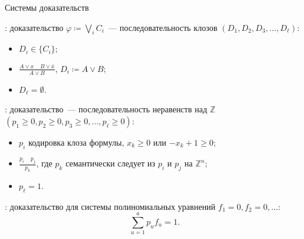 \begin{frame}{Системы доказательств}

    : доказательство $\varphi \coloneqq \bigvee\limits_{i} C_i$~--- последовательность
    клозов $(D_1, D_2, D_3, \dots, D_{\ell})$:
    \pause
    
    \begin{minipage}{0.3\linewidth}
        \begin{itemize}
            \item $D_i \in \{C_i\}$;
                \pause
            \item $\frac{A \lor x ~~~~~ B \lor \bar{x}}{A \lor B}$, $D_i \coloneqq A \lor B$;
                \pause
            \item $D_{\ell} = \emptyset$.
        \end{itemize}
    \end{minipage}
    \pause
    \begin{minipage}{0.68\linewidth}
        \centering
        
    \end{minipage}


    \pause
    \vspace{0.3cm}

    : доказательство~--- последовательность неравенств над $\mathbb{Z}$
    $(p_1 \ge 0, p_2 \ge 0, p_3 \ge 0, \dots, p_{\ell} \ge 0)$:
    \begin{itemize}
        \item $p_i$ кодировка клоза формулы, $x_k \ge 0$ или $-x_k + 1 \ge 0$;
        \item $\frac{p_i ~~~~~ p_j}{p_k}$, где $p_k$ семантически следует из $p_i$ и $p_j$ на
            $\mathbb{Z}^n$;
        \item $p_{\ell} = 1$.
    \end{itemize}

    \pause
    \vspace{0.3cm}

    : доказательство для системы полиномиальных уравнений $f_1 = 0, f_2 = 0,
    \dots$:
    $$
        \sum_{u = 1}^{a} p_u f_u = 1.
    $$
\end{frame}

